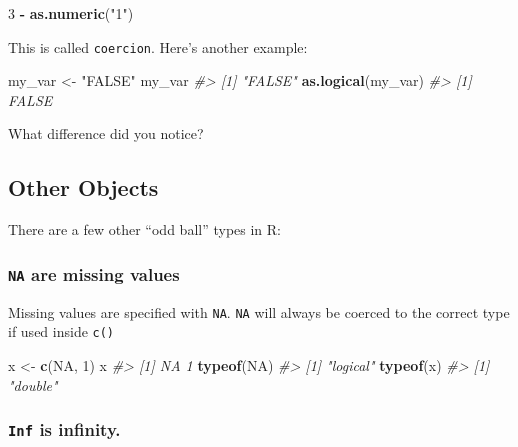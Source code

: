 \documentclass[]{book}
\newenvironment{Shaded}{\begin{snugshade}}{\end{snugshade}}
\newcommand{\KeywordTok}[1]{\textcolor[rgb]{0.13,0.29,0.53}{\textbf{#1}}}
\newcommand{\DecValTok}[1]{\textcolor[rgb]{0.00,0.00,0.81}{#1}}
\newcommand{\StringTok}[1]{\textcolor[rgb]{0.31,0.60,0.02}{#1}}
\newcommand{\CommentTok}[1]{\textcolor[rgb]{0.56,0.35,0.01}{\textit{#1}}}
\newcommand{\OtherTok}[1]{\textcolor[rgb]{0.56,0.35,0.01}{#1}}
\newcommand{\OperatorTok}[1]{\textcolor[rgb]{0.81,0.36,0.00}{\textbf{#1}}}
\newcommand{\NormalTok}[1]{#1}
\begin{document}
\begin{Shaded}
\begin{Highlighting}[]
\DecValTok{3} \OperatorTok{-}\StringTok{ }\KeywordTok{as.numeric}\NormalTok{(}\StringTok{"1"}\NormalTok{)}
\end{Highlighting}
\end{Shaded}

This is called \texttt{coercion}. Here's another example:

\begin{Shaded}
\begin{Highlighting}[]
\NormalTok{my_var <-}\StringTok{ "FALSE"}
\NormalTok{my_var}
\CommentTok{#> [1] "FALSE"}
\KeywordTok{as.logical}\NormalTok{(my_var)}
\CommentTok{#> [1] FALSE}
\end{Highlighting}
\end{Shaded}

What difference did you notice?

\subsection{Other Objects}\label{other-objects}

There are a few other ``odd ball'' types in R:

\subsubsection*{\texorpdfstring{\texttt{NA} are missing
values}{NA are missing values}}\label{na-are-missing-values}

Missing values are specified with \texttt{NA}. \texttt{NA} will always
be coerced to the correct type if used inside \texttt{c()}

\begin{Shaded}
\begin{Highlighting}[]
\NormalTok{x <-}\StringTok{ }\KeywordTok{c}\NormalTok{(}\OtherTok{NA}\NormalTok{, }\DecValTok{1}\NormalTok{)}
\NormalTok{x}
\CommentTok{#> [1] NA  1}
\KeywordTok{typeof}\NormalTok{(}\OtherTok{NA}\NormalTok{)}
\CommentTok{#> [1] "logical"}
\KeywordTok{typeof}\NormalTok{(x)}
\CommentTok{#> [1] "double"}
\end{Highlighting}
\end{Shaded}

\subsubsection*{\texorpdfstring{\texttt{Inf} is
infinity.}{Inf is infinity.}}\label{inf-is-infinity.}
\end{document}
